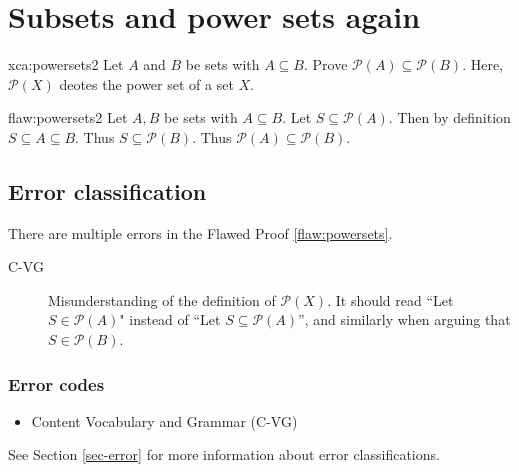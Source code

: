 \section{Subsets and power sets again}

\begin{xca}{xca:powersets2}
Let $A$ and $B$ be sets with $A \subseteq B$. Prove $\mathcal{P}(A) \subseteq \mathcal{P}(B)$. Here, $\mathcal{P}(X)$ deotes the power set of a set $X$. 
\end{xca}

\begin{flaw}{flaw:powersets2} %
Let $A,B$ be sets with $A \subseteq B$. Let $S \subseteq \mathcal{P}(A)$. Then by definition $S \subseteq A \subseteq B$. Thus $S \subseteq \mathcal{P}(B)$. Thus $\mathcal{P}(A) \subseteq \mathcal{P}(B)$. 
\end{flaw}

\clearpage
\subsection{Error classification}


There are multiple errors
 in the Flawed Proof \ref{flaw:powersets}. 
 
 \begin{description}
    \item[C-VG] Misunderstanding of the definition of $\mathcal{P}(X)$. It should read ``Let $S \in \mathcal{P}(A)$" instead of ``Let $S \subseteq \mathcal{P}(A)$'', and similarly when arguing that $S \in \mathcal{P}(B)$. 

 	
 \end{description}

 
\subsubsection{Error codes}
\begin{itemize}
    \item Content Vocabulary and Grammar (C-VG)
\end{itemize}
See Section \ref{sec-error} for more information about error classifications.

